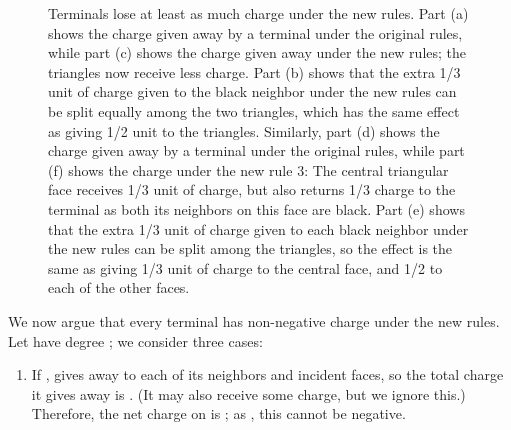 \documentclass[11pt]{article}
\renewenvironment{proof}{\vspace{-0.1in}\noindent{\bf Proof:}}{\hspace*{\fill}\par}
\begin{document}
\begin{proof}
\begin{figure}[h]
\begin{center}
    \end{center}
    \captionsetup{justification=centerfirst,font=small}
    \caption{Terminals lose at least as much charge under the new
      rules. \newline
      Part (a) shows the charge given away by a
      terminal under the original rules, while part (c) shows the
      charge given away under the new rules; the triangles now receive
      less charge.  Part (b) shows that the extra 1/3 unit of charge
      given to the black neighbor under the new rules can be split
      equally among the two triangles, which has the same effect as
      giving 1/2 unit to the triangles.
      Similarly, part (d) shows the charge given away by a terminal
      under the original rules, while part (f) shows the charge under
      the new rule 3: The central triangular face receives 1/3 unit of
      charge, but also returns 1/3 charge to the terminal as both its
      neighbors on this face are black. Part (e) shows that the extra
      1/3 unit of charge given to each black neighbor under the new
      rules can be split among the triangles, so the effect is the
      same as giving 1/3 unit of charge to the central face, and 1/2
      to each of the other faces.
    } \label{fig:discharging}
  \end{figure}


  We now argue that every terminal has non-negative charge under the
  new rules. Let  have degree ; we consider three cases:
  \begin{enumerate}
  \item If ,  gives away  to each of its 
    neighbors and  incident faces, so the total charge it gives
    away is . (It may also receive some charge, but we ignore
    this.) Therefore, the net charge on  is ; as , this cannot be negative.


\end{enumerate}
\end{proof}
\end{document}
